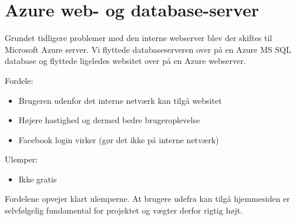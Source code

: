 \section{Azure web- og database-server}

Grundet tidligere problemer med den interne webserver blev der skiftes til Microsoft Azure server. Vi flyttede databaseserveren over på en Azure MS SQL database og flyttede ligeledes websitet over på en Azure webserver.

Fordele:
\begin{itemize}
	\item Brugeren udenfor det interne netværk kan tilgå websitet
	\item Højere hastighed og dermed bedre brugeroplevelse
	\item Facebook login virker (gør det ikke på interne netværk)
\end{itemize}

Ulemper:
\begin{itemize}
	\item Ikke gratis
\end{itemize}

Fordelene opvejer klart ulemperne. At brugere udefra kan tilgå hjemmesiden er selvfølgelig fundamental for projektet og vægter derfor rigtig højt.